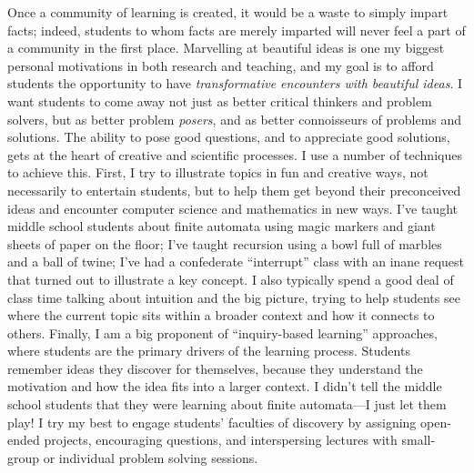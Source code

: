 \documentclass[12pt]{article}
\begin{document}
Once a community of learning is created, it would be a waste to simply
impart facts; indeed, students to whom facts are merely imparted will
never feel a part of a community in the first place. Marvelling at
beautiful ideas is one my biggest personal motivations in both
research and teaching, and my goal is to afford students the
opportunity to have \emph{transformative encounters with beautiful
  ideas}.  I want students to come away not just as better critical
thinkers and problem solvers, but as better problem \emph{posers}, and
as better connoisseurs of problems and solutions.  The ability to pose
good questions, and to appreciate good solutions, gets at the heart of
creative and scientific processes.  I use a number of techniques to
achieve this.  First, I try to illustrate topics in fun and creative
ways, not necessarily to entertain students, but to help them get
beyond their preconceived ideas and encounter computer science and
mathematics in new ways.  I've taught middle school students about
finite automata using magic markers and giant sheets of paper on the
floor; I've taught recursion using a bowl full of marbles and a ball
of twine; I've had a confederate ``interrupt'' class with an inane
request that turned out to illustrate a key concept.  I also typically
spend a good deal of class time talking about intuition and the big
picture, trying to help students see where the current topic sits
within a broader context and how it connects to others.  Finally, I am
a big proponent of ``inquiry-based learning'' approaches, where
students are the primary drivers of the learning process. Students
remember ideas they discover for themselves, because they understand
the motivation and how the idea fits into a larger context. I didn't
tell the middle school students that they were learning about finite
automata---I just let them play! I try my best to engage students'
faculties of discovery by assigning open-ended projects, encouraging
questions, and interspersing lectures with small-group or individual
problem solving sessions.


\end{document}
